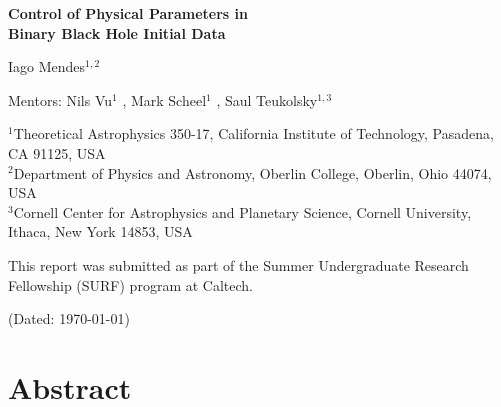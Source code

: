 \documentclass{../document}
\newcommand{\Caltech}{Theoretical Astrophysics 350-17, California Institute of Technology, Pasadena, CA 91125, USA}
\newcommand{\CaltechId}{1}
\newcommand{\Oberlin}{Department of Physics and Astronomy, Oberlin College, Oberlin, Ohio 44074, USA}
\newcommand{\OberlinId}{2}
\newcommand{\Cornell}{Cornell Center for Astrophysics and Planetary Science, Cornell University, Ithaca, New York 14853, USA}
\newcommand{\CornellId}{3}
\begin{document}
  \thispagestyle{title}

  \begin{center}
    \Large\bf
    Control of Physical Parameters in \\
    Binary Black Hole Initial Data
  \end{center}
    
  \begin{center}
    Iago Mendes$^{\CaltechId,\OberlinId}$
  \end{center}

  \begin{flushleft}
    Mentors:
      Nils Vu$^\CaltechId$
        ,
      Mark Scheel$^\CaltechId$
        ,
      Saul Teukolsky$^{\CaltechId,\CornellId}$
  \end{flushleft}
   
  \begin{flushleft}
    \footnotesize
    $^\CaltechId$\Caltech \\
    $^\OberlinId$\Oberlin \\
    $^\CornellId$\Cornell
  \end{flushleft}

  \begin{flushleft}
    This report was submitted as part of the Summer Undergraduate Research Fellowship (SURF) program at Caltech.
  \end{flushleft}

  \begin{center}
    (Dated: \today)
  \end{center}

  \section*{Abstract}
\end{document}
